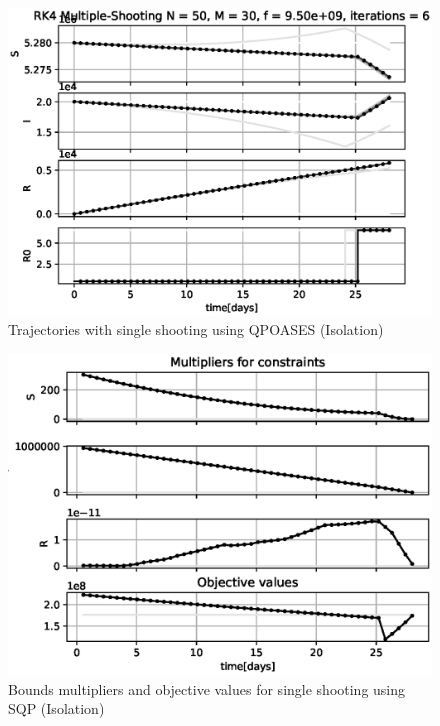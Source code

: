 \begin{figure}[H]
    \centering
    \includegraphics[width=.8\textwidth]{pythonProject/Figures/Multiple_Shooting_Trajectory_SQP_Social_Distancing.eps}
    \caption{Trajectories with single shooting using QPOASES (Isolation)}
    \label{fig:SH_Traj_SQP_I}
\end{figure}

\begin{figure}[H]
    \centering
    \includegraphics[width=.8\textwidth]{pythonProject/Figures/Multiple_Shooting_obj_con_SQP_Social_Distancing.eps}
    \caption{Bounds multipliers and objective values for single shooting using SQP (Isolation)}
    \label{fig:SH_con_obj_SQP_I}
\end{figure}

